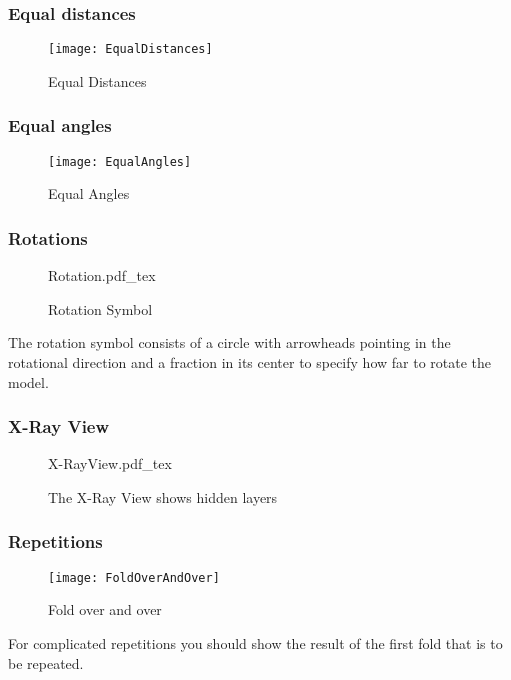 \subsubsection*{Equal distances}
\begin{figure}[htbp]
	\centering
	\texttt{[image: EqualDistances]}
	\caption{Equal Distances}
	\label{fig:equalDistances}
\end{figure}

\subsubsection*{Equal angles}
\begin{figure}[htbp]
	\centering
	\texttt{[image: EqualAngles]}
	\caption{Equal Angles}
	\label{fig:equalAngles}
\end{figure}

\subsubsection*{Rotations }
\begin{figure}[htbp]
	\centering
	\def\svgwidth{0.2\textwidth}
	{Rotation.pdf_tex}
	\caption{Rotation Symbol}
	\label{fig:rotation}
\end{figure}
\noindent The rotation symbol consists of a circle with arrowheads pointing in the rotational direction and a fraction in its center to specify how far to rotate the model.

\subsubsection*{X-Ray View}
\begin{figure}[htbp]
	\centering
	\def\svgwidth{0.7\textwidth}
	{X-RayView.pdf_tex}
	\caption{The X-Ray View shows hidden layers}
	\label{fig:x-rayView}
\end{figure}

\subsubsection*{Repetitions }
\begin{figure}[htbp]
	\centering
	\texttt{[image: FoldOverAndOver]}
	\caption{Fold over and over}
	\label{fig:foldOverAndOver}
\end{figure}
\noindent For complicated repetitions you should show the result of the first fold that is to be repeated.

